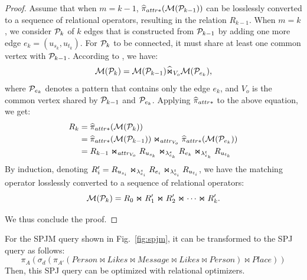 \begin{proof}
Assume that when $m = k-1$, $\widehat{\pi}_{attr*}(\mathcal{M}(\mathcal{P}_{k-1}))$ can be losslessly converted to a sequence of relational operators, resulting in the relation $R_{k-1}$. When $m = k$, we consider $\mathcal{P}_{k}$ of $k$ edges that is constructed from $\mathcal{P}_{k-1}$ by adding one more edge $e_k = (u_{s_k}, u_{t_k})$. For $\mathcal{P}_{k}$ to be connected, it must share at least one common vertex with $\mathcal{P}_{k-1}$. According to , we have:
\[ \mathcal{M}(\mathcal{P}_{k}) = \mathcal{M}(\mathcal{P}_{k-1}) \widehat{\Join}_{V_o} \mathcal{M}(\mathcal{P}_{e_k}), \]
where $\mathcal{P}_{e_k}$ denotes a pattern that contains only the edge $e_k$, and $V_o$ is the common vertex shared by $\mathcal{P}_{k-1}$ and $\mathcal{P}_{e_k}$. Applying $\widehat{\pi}_{attr*}$ to the above equation, we get:
\begin{equation*}
\begin{split}
R_k &= \widehat{\pi}_{attr*}(\mathcal{M}(\mathcal{P}_{k})) \\
    &= \widehat{\pi}_{attr*}(\mathcal{M}(\mathcal{P}_{k-1})) \Join_{attr_{V_o}} \widehat{\pi}_{attr*}(\mathcal{M}(\mathcal{P}_{e_k})) \\
    &= R_{k-1} \Join_{attr_{V_o}} {R_{u_{s_k}}} \Join_{\lambda_{e_k}^s} {R_{e_k}} \Join_{\lambda_{e_k}^t} {R_{u_{t_k}}}
\end{split}
\end{equation*}
By induction, denoting $R'_i = {R_{u_{s_i}}} \Join_{\lambda_{e_i}^s} {R_{e_i}} \Join_{\lambda_{e_i}^t} {R_{u_{t_i}}}$, we have the matching operator losslessly converted to a sequence of relational operators:
\[ \mathcal{M}(\mathcal{P}_{k}) = R_0 \Join R'_1 \Join R'_2 \Join \cdots \Join R'_{k}. \]

We thus conclude the proof.
\end{proof}


\begin{example}
    For the SPJM query shown in Fig.~\ref{fig:spjm}, it can be transformed to the SPJ query as follows:
    \begin{equation*}
        \pi_A(\sigma_d(\pi_{A'}(Person \Join Likes \Join Message \Join Likes \Join Person) \Join Place))
    \end{equation*}
    Then, this SPJ query can be optimized with relational optimizers.
\end{example}

